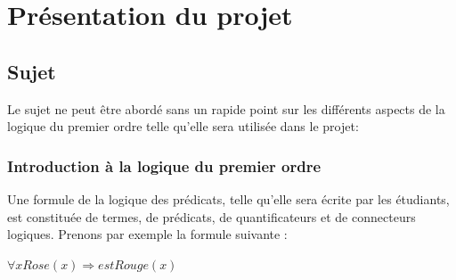 \chapter{Présentation du projet}


\section{Sujet}
Le sujet ne peut être abordé sans un rapide point sur les différents aspects de la logique du premier ordre telle qu'elle sera utilisée dans le projet:

\subsection{Introduction à la logique du premier ordre}
Une formule de la logique des prédicats, telle qu'elle sera écrite par
les étudiants, est constituée de termes, de prédicats, de
quantificateurs et de connecteurs logiques. Prenons par exemple la
formule suivante :

\begin{center}
	$ \forall x Rose(x) \Rightarrow estRouge(x) $
\end{center}

